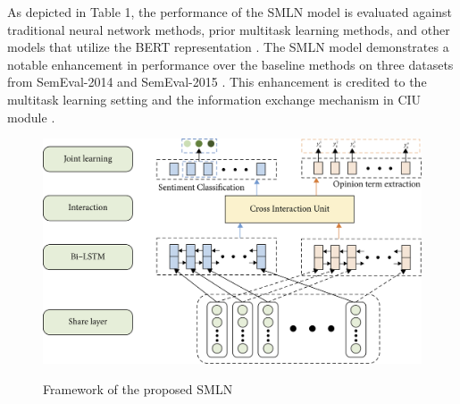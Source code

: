 \documentclass{article}
\begin{document}
As depicted in Table 1, the performance of the SMLN model is evaluated against traditional neural network methods, prior multitask learning methods, and other models that utilize the BERT representation \cite{Yao2021MultitaskLF}. The SMLN model demonstrates a notable enhancement in performance over the baseline methods on three datasets from SemEval-2014 and SemEval-2015 \cite{Yao2021MultitaskLF}. This enhancement is credited to the multitask learning setting and the information exchange mechanism in CIU module \cite{Yao2021MultitaskLF}.
\begin{figure}
    \centering
    \includegraphics[width=0.5\linewidth]{SMLN.png}
    \caption{Framework of the proposed SMLN}
    \label{SMLN}
    \cite{Yao2021MultitaskLF}
\end{figure}
\end{document}

